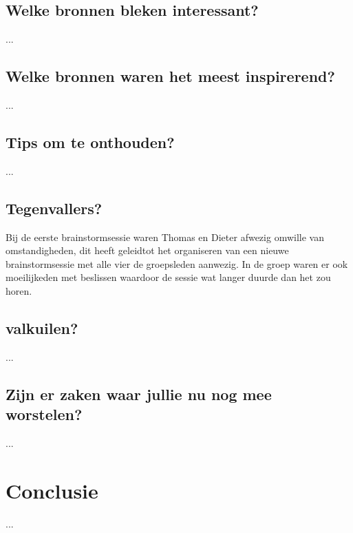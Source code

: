 \documentclass[fleqn,10pt]{voorstel}
\begin{document}
\subsection{Welke bronnen bleken interessant?}
...
\subsection{Welke bronnen waren het meest inspirerend?}
...
\subsection{Tips om te onthouden?}
...
\subsection{Tegenvallers?}
Bij de eerste brainstormsessie waren Thomas en Dieter afwezig omwille van omstandigheden, dit heeft geleidtot het organiseren van een nieuwe brainstormsessie met alle vier de groepsleden aanwezig. In de groep waren er ook
moeilijkeden met beslissen waardoor de sessie wat langer duurde dan het zou horen.
\subsection{valkuilen?}
...
\subsection{Zijn er zaken waar jullie nu nog mee worstelen?}
...

\section{Conclusie}
...




\end{document}
